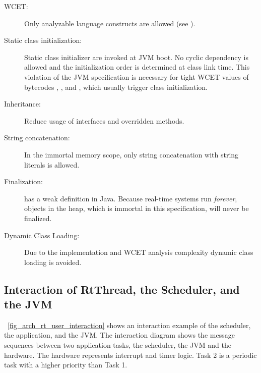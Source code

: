 \begin{description}
    \item[WCET:] Only analyzable language constructs are allowed
        (see \cite{pusch:maxt:jnl}).

    \item[Static class initialization:] Static class initializer
        are invoked at JVM boot. No cyclic dependency is allowed
        and the initialization order is determined at class link
        time. This violation of the JVM specification is
        necessary for tight WCET values of bytecodes ,
        , and , which usually
        trigger class initialization.

    \item[Inheritance:] Reduce usage of interfaces and overridden methods.

    \item[String concatenation:] In the immortal memory scope,
        only string concatenation with string literals is
        allowed.

    \item[Finalization:]  has a weak definition
        in Java. Because real-time systems run \emph{forever},
        objects in the heap, which is immortal in this
        specification, will never be finalized.

    \item[Dynamic Class Loading:] Due to the implementation and WCET analysis
complexity dynamic class loading is avoided.

\end{description}


\subsection{Interaction of RtThread, the Scheduler, and the JVM}


\figurename~\ref{fig_arch_rt_user_interaction} shows an interaction
example of the scheduler, the application, and the JVM. The
interaction diagram shows the message sequences between two
application tasks, the scheduler, the JVM and the hardware. The
hardware represents interrupt and timer logic. Task 2 is a periodic
task with a higher priority than Task 1.

